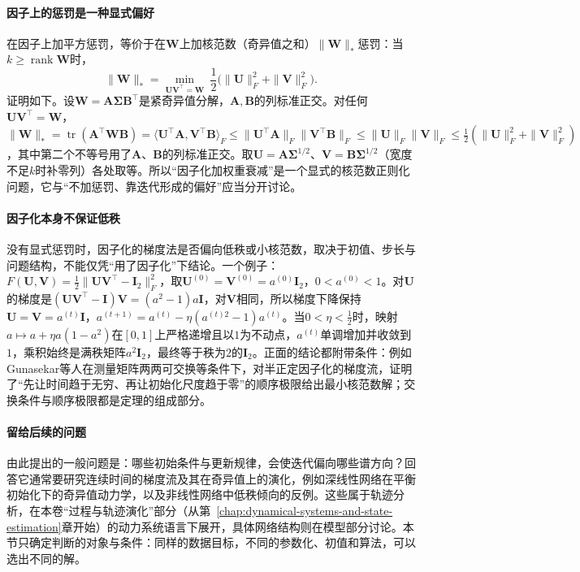 \paragraph{因子上的惩罚是一种显式偏好}
在因子上加平方惩罚，等价于在$\bm W$上加核范数（奇异值之和）$\|\bm W\|_*$惩罚：当$k\ge\operatorname{rank}\bm W$时，
\[
  \|\bm W\|_*=\min_{\bm U\bm V^\top=\bm W}\ \frac12\bigl(\|\bm U\|_F^2+\|\bm V\|_F^2\bigr).
\]
证明如下。设$\bm W=\bm A\bm\Sigma\bm B^\top$是紧奇异值分解，$\bm A,\bm B$的列标准正交。对任何$\bm U\bm V^\top=\bm W$，$\|\bm W\|_*=\operatorname{tr}(\bm A^\top\bm W\bm B)=\langle\bm U^\top\bm A,\bm V^\top\bm B\rangle_F\le\|\bm U^\top\bm A\|_F\|\bm V^\top\bm B\|_F\le\|\bm U\|_F\|\bm V\|_F\le\tfrac12(\|\bm U\|_F^2+\|\bm V\|_F^2)$，其中第二个不等号用了$\bm A$、$\bm B$的列标准正交。取$\bm U=\bm A\bm\Sigma^{1/2}$、$\bm V=\bm B\bm\Sigma^{1/2}$（宽度不足$k$时补零列）各处取等。所以“因子化加权重衰减”是一个显式的核范数正则化问题，它与“不加惩罚、靠迭代形成的偏好”应当分开讨论。

\paragraph{因子化本身不保证低秩}
没有显式惩罚时，因子化的梯度法是否偏向低秩或小核范数，取决于初值、步长与问题结构，不能仅凭“用了因子化”下结论。一个例子：$F(\bm U,\bm V)=\tfrac12\|\bm U\bm V^\top-\bm I_2\|_F^2$，取$\bm U^{(0)}=\bm V^{(0)}=a^{(0)}\bm I_2$，$0<a^{(0)}<1$。对$\bm U$的梯度是$(\bm U\bm V^\top-\bm I)\bm V=(a^2-1)a\bm I$，对$\bm V$相同，所以梯度下降保持$\bm U=\bm V=a^{(t)}\bm I$，$a^{(t+1)}=a^{(t)}-\eta(a^{(t)2}-1)a^{(t)}$。当$0<\eta<\tfrac12$时，映射$a\mapsto a+\eta a(1-a^2)$在$[0,1]$上严格递增且以$1$为不动点，$a^{(t)}$单调增加并收敛到$1$，乘积始终是满秩矩阵$a^2\bm I_2$，最终等于秩为$2$的$\bm I_2$。正面的结论都附带条件：例如Gunasekar等人在测量矩阵两两可交换等条件下，对半正定因子化的梯度流，证明了“先让时间趋于无穷、再让初始化尺度趋于零”的顺序极限给出最小核范数解；交换条件与顺序极限都是定理的组成部分。

\paragraph{留给后续的问题}
由此提出的一般问题是：哪些初始条件与更新规律，会使迭代偏向哪些谱方向？回答它通常要研究连续时间的梯度流及其在奇异值上的演化，例如深线性网络在平衡初始化下的奇异值动力学，以及非线性网络中低秩倾向的反例。这些属于轨迹分析，在本卷“过程与轨迹演化”部分（从第~\ref{chap:dynamical-systems-and-state-estimation}章开始）的动力系统语言下展开，具体网络结构则在模型部分讨论。本节只确定判断的对象与条件：同样的数据目标，不同的参数化、初值和算法，可以选出不同的解。
